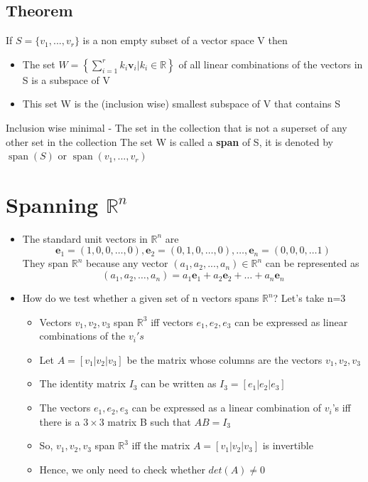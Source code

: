 \documentclass{article}[18pt]
\begin{document}
\subsection{Theorem}
If $S=\{v_1,...,v_r\}$ is a non empty subset of a vector space V then
\begin{itemize}
	\item The set $W = \left\{ \sum _ { i = 1 } ^ { r } k _ { i } \mathbf { v } _ { i } | k _ { i } \in \mathbb { R } \right\}$ of all linear combinations of the vectors in S is a subspace of V
	\item This set W is the (inclusion wise) smallest subspace of V that contains S
\end{itemize}
Inclusion wise minimal - The set in the collection that is not a superset of any other set in the collection
The set W is called a \textbf{span} of S, it is denoted by $\operatorname{span}(S)$ or $\operatorname{span}(v_1,...,v_r)$
\section{Spanning $\mathbb{ R }^n$}
\begin{itemize}
	\item The standard unit vectors in $\mathbb{ R }^n$ are
	$$\mathbf { e } _ { 1 } = ( 1,0,0 , \ldots , 0 ) , \mathbf { e } _ { 2 } = ( 0,1,0 , \ldots , 0 ) , \ldots , \mathbf { e } _ { n } = ( 0,0,0 , \ldots 1 )$$
	They span $\mathbb{ R }^n$ because any vector $(a_1,a_2,...,a_n)\in \mathbb{ R }^n$ can be represented as
	$$\left( a _ { 1 } , a _ { 2 } , \ldots , a _ { n } \right) = a _ { 1 } \mathbf { e } _ { 1 } + a _ { 2 } \mathbf { e } _ { 2 } + \ldots + a _ { n } \mathbf { e } _ { n }$$
	\item How do we test whether a given set of n vectors spans $\mathbb{ R }^n$? Let's take n=3
	\begin{itemize}
		\item Vectors $v_1,v_2,v_3$ span $\mathbb{ R }^3$ iff vectors $e_1,e_2,e_3$ can be expressed as linear combinations of the $v_i's$
		\item Let $A=[v_1|v_2|v_3]$ be the matrix whose columns are the vectors $v_1,v_2,v_3$
		\item The identity matrix $I_3$ can be written as $I_3=[e_1|e_2|e_3]$
		\item The vectors $e_1,e_2,e_3$ can be expressed as a linear combination of $v_i$'s iff there is a $3\times 3$ matrix B such that $AB=I_3$
		\item So, $v_1,v_2,v_3$ span $\mathbb{ R }^3$ iff the matrix $A=[v_1|v_2|v_3]$ is invertible
		\item Hence, we only need to check whether $det(A)\neq 0$
	\end{itemize}
\end{itemize}
\end{document}
